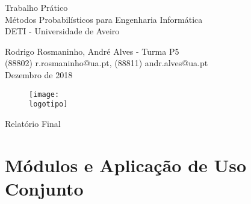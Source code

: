 \documentclass{report}
\begin{document}
%
\def\titulo{Trabalho Prático}
\def\data{Dezembro de 2018}
\def\autores{Rodrigo Rosmaninho, André Alves - Turma P5}
\def\autorescontactos{(88802) r.rosmaninho@ua.pt, (88811) andr.alves@ua.pt}
\def\versao{Relatório Final}
\def\departamento{DETI - Universidade de Aveiro}
\def\empresa{Métodos Probabilísticos para Engenharia Informática}
\def\logotipo{ua.pdf}
%
%
\begin{titlepage}
\begin{center}
%
\vspace*{40mm}
%
{\Huge \titulo}\\ 
%
\vspace{10mm}
%
{\Large \empresa\\\departamento}
%
\vspace{8mm}
%

{\Large \autores \\
    \autorescontactos \\
}
%
\vspace{8mm}
%
{\Large \data}\\
%
\vspace{24mm}
%
\begin{figure}[h]
\center
\texttt{[image: \\logotipo]}
\end{figure}
%
\vspace{30mm}
\end{center}
%
\begin{flushright}
\versao
\end{flushright}
\end{titlepage}

\clearpage
{}


\chapter{Módulos e Aplicação de Uso Conjunto}
\label{chap.Modulos}
\end{document}
